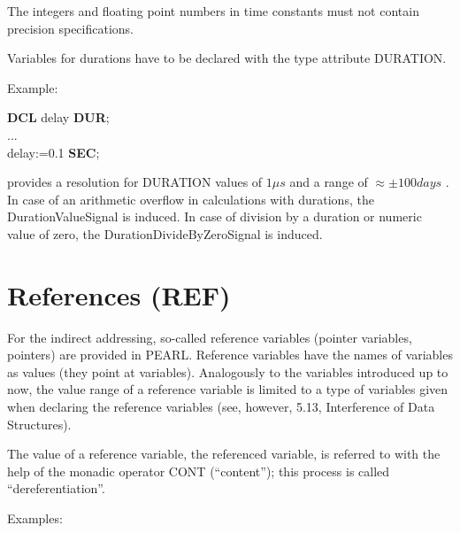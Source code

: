 The integers and floating point numbers in time constants must not
contain precision specifications.

Variables for durations have to be declared with the type attribute
DURATION.



Example:

{\bf DCL} delay {\bf DUR};\\
...\\
delay:=0.1 {\bf SEC};

\OpenPEARL{} provides a resolution for DURATION values of $1\mu s$ 
and
a range of $\approx \pm 100 days$ .
In case of an arithmetic overflow in calculations with durations, the
DurationValueSignal is induced.
In case of division by a duration or numeric value of zero, 
the DurationDivideByZeroSignal is induced.

\section{References (REF)}  %
\label{sec_references}

For the indirect addressing, so-called reference variables (pointer
variables, pointers) are provided in PEARL. Reference variables have the
names of variables as values (they point at variables). Analogously to
the variables introduced up to now, the value range of a reference
variable is limited to a type of variables given when declaring the
reference variables (see, however, 5.13, Interference of Data
Structures).

The value of a reference variable, the referenced variable, is referred
to with the help of the monadic operator CONT (``content''); this
process is called ``dereferentiation''.

Examples:

